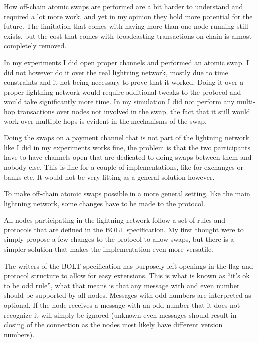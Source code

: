 How off-chain atomic swaps are performed are a bit harder to understand and 
required a lot more work, and yet in my opinion they hold more potential for 
the future. The limitation that comes with having more than one node running 
still exists, but the cost that comes with broadcasting transactions on-chain 
is almost completely removed. 

In my experiments I did open proper channels and performed an atomic swap. 
I did not however do it over the real lightning  network, mostly due to time 
constraints and it not being necessary to prove that it worked. Doing it over 
a proper lightning network would require additional tweaks to the protocol and 
would take significantly more time. In my simulation I did not perform any 
multi-hop transactions over nodes not involved in the swap, the fact that it
still would work over multiple hops is evident in the mechanisms of the swap.

Doing the swaps on a payment channel that is not part of the lightning network
like I did in my experiments works fine, the problem is that the two participants
have to have channels open that are dedicated to doing swaps between them and nobody
else. This is fine for a couple of implementations, like for exchanges or banks 
etc. It would not be very fitting as a general solution however. 

To make off-chain atomic swaps possible in a more general setting, like the main
lightning network, some changes have to be made to the protocol. 

All nodes participating in the lightning network follow a set of rules and 
protocols that are defined in the BOLT specification.\cite{bolt} My first thought were to
simply propose a few changes to the protocol to allow swaps, but there is a 
simpler solution that makes the implementation even more versatile. 

The writers of the BOLT specification has purposely left openings in the
flag and protocol structure to allow for easy extensions.\cite{bolt} This is what is known
as \enquote{it's ok to be odd rule}, what that means is that any  message with
and even number should be supported by all nodes. Messages with odd numbers 
are interpreted as optional. If the node receives a message with an odd number 
that it does not recognize it will simply be ignored (unknown even messages 
should result in closing of the connection as the nodes most likely
have different version numbers).

